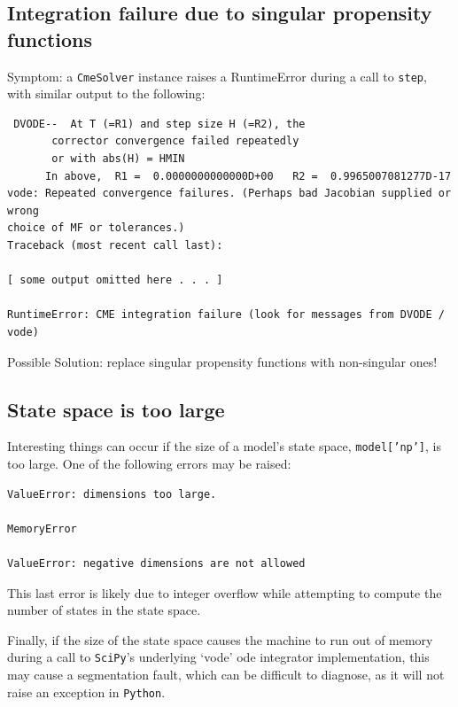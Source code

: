 \documentclass{article}
\newcommand{\mono}[1]{\texttt{#1}}
\newcommand{\python}{\mono{Python}}
\newcommand{\scipy}{\mono{SciPy}}
\begin{document}
\subsection{Integration failure due to singular propensity functions}
Symptom: a \mono{CmeSolver} instance raises a RuntimeError during a call to
\mono{step}, with similar output to the following:
\begin{verbatim}
 DVODE--  At T (=R1) and step size H (=R2), the    
       corrector convergence failed repeatedly     
       or with abs(H) = HMIN   
      In above,  R1 =  0.0000000000000D+00   R2 =  0.9965007081277D-17
vode: Repeated convergence failures. (Perhaps bad Jacobian supplied or wrong
choice of MF or tolerances.)
Traceback (most recent call last):

[ some output omitted here . . . ]

RuntimeError: CME integration failure (look for messages from DVODE / vode)
\end{verbatim}
Possible Solution: replace singular propensity functions with non-singular ones!

\subsection{State space is too large}

Interesting things can occur if the size of a model's state space,
\mono{model['np']}, is too large. One of the following errors may be raised:

\begin{verbatim}
ValueError: dimensions too large.

MemoryError

ValueError: negative dimensions are not allowed
\end{verbatim}
This last error is likely due to integer overflow while attempting to compute
the number of states in the state space.

Finally, if the size of the state space causes the machine to run out of
memory during a call to \scipy{}'s underlying `vode' ode integrator
implementation, this may cause a segmentation fault, which can be difficult to
diagnose, as it will not raise an exception in \python{}.
\end{document}
